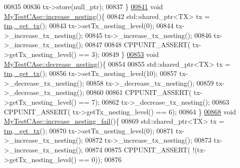 \begin{DoxyCode}
00835 
00836     tx->store(null\_ptr);
00837 \}
\hypertarget{_my_test_c_ase_8cpp_source.tex_l00841}{}\hyperlink{class_my_test_c_ase_aadf771b5eefc5f32984cb6c177d217d0_aadf771b5eefc5f32984cb6c177d217d0}{00841} \textcolor{keywordtype}{void} \hyperlink{class_my_test_c_ase_aadf771b5eefc5f32984cb6c177d217d0_aadf771b5eefc5f32984cb6c177d217d0}{MyTestCAse::increase\_nesting}()\{
00842     std::shared\_ptr<TX> tx = \hyperlink{class_my_test_c_ase_a422e6e5d4ddedea384be96031c89b72b_a422e6e5d4ddedea384be96031c89b72b}{tm}.\hyperlink{class_t_m_a41cb0226cc4080c931651b13f74a0075_a41cb0226cc4080c931651b13f74a0075}{\_get\_tx}();
00843     tx->setTx\_nesting\_level(0);
00844     tx->\_increase\_tx\_nesting();
00845     tx->\_increase\_tx\_nesting();
00846     tx->\_increase\_tx\_nesting();
00847 
00848     CPPUNIT\_ASSERT( tx->getTx\_nesting\_level() == 3);
00849 \}
\hypertarget{_my_test_c_ase_8cpp_source.tex_l00853}{}\hyperlink{class_my_test_c_ase_a2da7267d6799893e898032f5ae54c1e1_a2da7267d6799893e898032f5ae54c1e1}{00853} \textcolor{keywordtype}{void} \hyperlink{class_my_test_c_ase_a2da7267d6799893e898032f5ae54c1e1_a2da7267d6799893e898032f5ae54c1e1}{MyTestCAse::decrease\_nesting}()\{
00854     
00855     std::shared\_ptr<TX> tx = \hyperlink{class_my_test_c_ase_a422e6e5d4ddedea384be96031c89b72b_a422e6e5d4ddedea384be96031c89b72b}{tm}.\hyperlink{class_t_m_a41cb0226cc4080c931651b13f74a0075_a41cb0226cc4080c931651b13f74a0075}{\_get\_tx}();
00856     tx->setTx\_nesting\_level(10);
00857     tx->\_decrease\_tx\_nesting();
00858     tx->\_decrease\_tx\_nesting();
00859     tx->\_decrease\_tx\_nesting();
00860     
00861     CPPUNIT\_ASSERT( tx->getTx\_nesting\_level() == 7);
00862     tx->\_decrease\_tx\_nesting();
00863     CPPUNIT\_ASSERT( tx->getTx\_nesting\_level() == 6);
00864 \}
\hypertarget{_my_test_c_ase_8cpp_source.tex_l00868}{}\hyperlink{class_my_test_c_ase_af72ca0f6e19543b2bc80f8fc5181dae7_af72ca0f6e19543b2bc80f8fc5181dae7}{00868} \textcolor{keywordtype}{void} \hyperlink{class_my_test_c_ase_af72ca0f6e19543b2bc80f8fc5181dae7_af72ca0f6e19543b2bc80f8fc5181dae7}{MyTestCAse::increase\_nesting\_fail}()\{
00869     std::shared\_ptr<TX> tx = \hyperlink{class_my_test_c_ase_a422e6e5d4ddedea384be96031c89b72b_a422e6e5d4ddedea384be96031c89b72b}{tm}.\hyperlink{class_t_m_a41cb0226cc4080c931651b13f74a0075_a41cb0226cc4080c931651b13f74a0075}{\_get\_tx}();
00870     tx->setTx\_nesting\_level(0);
00871     tx->\_increase\_tx\_nesting();
00872     tx->\_increase\_tx\_nesting();
00873     tx->\_increase\_tx\_nesting();
00874 
00875     CPPUNIT\_ASSERT( !(tx->getTx\_nesting\_level() == 0));
00876 

\end{DoxyCode}
